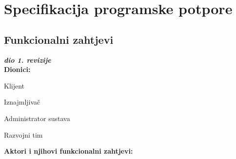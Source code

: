 \chapter{Specifikacija programske potpore}
		
	\section{Funkcionalni zahtjevi}
			
			\textbf{\textit{dio 1. revizije}}\\
			
			\noindent \textbf{Dionici:}
			
			\begin{packed_enum}
				
				\item Klijent
				\item Iznajmljivač			
				\item Administrator sustava
				\item Razvojni tim 
				
			\end{packed_enum}
			
			\noindent \textbf{Aktori i njihovi funkcionalni zahtjevi:}
			
